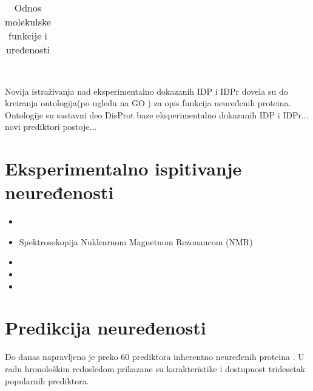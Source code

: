 \begin{table}[h!]
  \centering
  \caption{Odnos molekulske funkcije i uređenosti}
  \label{tab:funkcija_uvod}
  \begin{tabular}{c}
  
  \end{tabular}
\end{table}


 \\
Novija istraživanja nad eksperimentalno dokazanih IDP i IDPr dovela su do
kreiranja ontologija(po ugledu na GO \parencite{GO2000}) za opis funkcija
neuređenih proteina. Ontologije su sastavni deo DisProt \parencite{disprot7}
baze eksperimentalno dokazanih IDP i IDPr... novi prediktori postoje...

\section{Eksperimentalno ispitivanje neuređenosti}

\begin{itemize}
  \item {} 
  \item Spektrosokopija Nuklearnom Magnetnom Rezonancom (NMR) 
  \item {}
  \item {}
  \item {}
\end{itemize}


\section{Predikcija neuređenosti}

Do danas napravljeno je preko 60 prediktora inherentno neuređenih
proteina \parencite{meng2017}. U radu \parencite{meng_c2017} hronološkim
redosledom prikazane su karakteristike i dostupnost tridesetak popularnih
prediktora.


